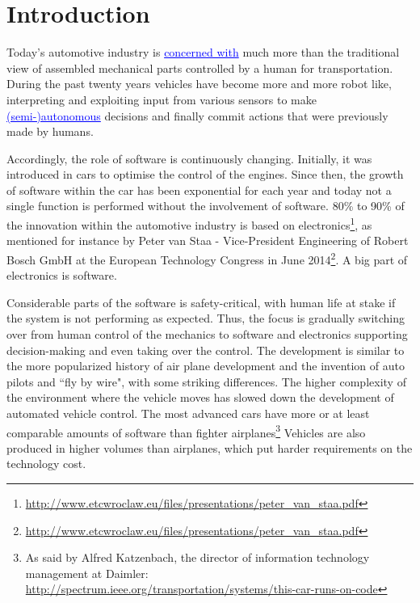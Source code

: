 \documentclass[preprint,12pt,3p]{elsarticle}
\newcommand{\ins}[1]{\textcolor{blue}{\uline{#1}}} %
\newcommand\patrizio[1]{\nb{Patrizio}{#1}}
\newcommand\eric[1]{\nb{Eric}{#1}}
\begin{document}

\section{Introduction}
\label{sec:intro}
Today's automotive industry is \ins{concerned with} much more than the traditional view of assembled
mechanical parts controlled by a human for transportation. During the past
twenty years vehicles have become more and more robot like, interpreting and
exploiting input from various sensors to make \ins{(semi-)autonomous} decisions and finally commit
actions that were previously made by humans.  

Accordingly, the role of software is continuously changing. Initially, it was introduced in cars to optimise the
control of the engines. Since then, the growth of software within the car has
been exponential for each year and today not a single function is performed
without the involvement of software. 
80\% to 90\% of the innovation within the automotive industry is based on electronics\footnote{\url{http://www.etcwroclaw.eu/files/presentations/peter_van_staa.pdf}}, 
as mentioned for instance by Peter van Staa - Vice-President Engineering of Robert Bosch GmbH at the European Technology Congress in June 2014\footnote{\url{http://www.etcwroclaw.eu/files/presentations/peter_van_staa.pdf}}. 
A big part of electronics is software.

Considerable parts of the
software is safety-critical, with human life at stake if the system is not performing as
expected. Thus, the focus is gradually switching over from human control of the
mechanics to software and electronics supporting decision-making and even taking
over the control. 
The development is similar to the more popularized history of
air plane development and the invention of auto pilots and ``fly by wire", with
some striking differences. The higher complexity of the environment where the
vehicle moves has slowed down the development of automated vehicle control. The
most advanced cars have more or at least comparable amounts of software than fighter
airplanes\footnote{As said by Alfred Katzenbach, the director of information technology management at Daimler: \url{http://spectrum.ieee.org/transportation/systems/this-car-runs-on-code}}
Vehicles are also produced in higher volumes than airplanes, which put harder requirements on the technology cost.
\end{document}
